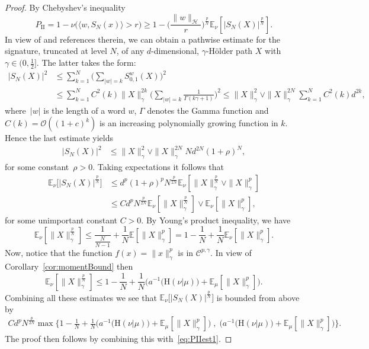 \documentclass[twoside,11pt]{article}
\numberwithin{equation}{section}
\numberwithin{theorem}{section}
\newcommand{\ex}{\mathbb{E}}
\newcommand{\h}{\mathcal{H}}
\newcommand{\Oo}{\mathcal{O}}
\newcommand{\Cc}{\mathscr{C}}
\newcommand{\Hent}{\boldsymbol{\mathrm{H}}}
\begin{document}
\begin{proof}
By Chebyshev's inequality
\begin{equation}\label{eq:PIIest1}
P_{\mathrm{II}}=1-\nu\bigg( \langle w, S_N(x)\rangle>  r     \bigg)\geq 1-\bigg(\frac{\|w\|_{\h}}{r}\bigg)^{\frac{p}{N}}\ex_\nu\left[|S_N(X)|^{\frac{p}{N}}\right].
   \end{equation} 
In view of
\cite[Section 1]{boedihardjo2018decay} and references therein, we can obtain a pathwise estimate %
for the signature, truncated at level $N$, of any $d$-dimensional, $\gamma$-H\"older path $X$ with $\gamma\in(0, \frac{1}{2}]$. The latter takes the form:
\begin{align*}
\big|S_N(X)\big|^2
 &\leq \sum_{k=1}^{N}\bigg(\sum_{|w|=k} S^w_{0,1}(X)\bigg)^2
 \\& \leq \sum_{k=1}^{N} C^2(k)\|X\|^{2k}_\gamma\bigg(\sum_{|w|=k}\frac{1}{\Gamma(k\gamma+1)}\bigg)^2\leq \|X\|^{2}_\gamma\vee\|X\|^{2N}_\gamma\sum_{k=1}^{N} C^2(k)d^{2k},
\end{align*}
where~$|w|$ is the length of a word $w$, $\Gamma$ denotes the Gamma function and $C(k)=\Oo((1+c)^k)$ is an increasing polynomially growing function in $k$.
Hence the last estimate yields 
\begin{equation}\label{eq:SigPathwiseBound}
    \begin{aligned}
\big|S_N(X)\big|^2
&\leq \|X\|^{2}_\gamma \vee\|X\|^{2N}_\gamma Nd^{2N}(1+\rho)^N,
    \end{aligned}
\end{equation}
for some constant~$\rho>0.$
Taking expectations it follows that
\begin{align*}
\ex_\nu\bigg[ \big|S_N(X)\big|^{\frac{p}{N}}\bigg]
 & \leq d^{p}(1+\rho)^{p}N^{\frac{p}{2N}}\ex_\nu\left[\|X\|^{\frac{p}{N}}_\gamma\vee\|X\|^p_\gamma \right]\\
 & \leq C d^{p}N^{\frac{p}{2N}}\ex_\nu\left[\|X\|^{\frac{p}{N}}_\gamma\right]\vee
\ex_\nu\left[\|X\|^p_\gamma \right],
\end{align*} 
for some unimportant constant $C>0$.
By Young's product inequality, we have
$$
\ex_\nu\left[\|X\|^{\frac{p}{N}}_\gamma\right]
\leq \frac{1}{\frac{N}{N-1}}+\frac{1}{N}\ex[\|X\|^{p}_\gamma]=1-\frac{1}{N}+ \frac{1}{N}\ex_\nu[\|X\|^{p}_\gamma].$$
Now, notice that the function $f(x)=\|x\|_\gamma^{p}$ is in $\Cc^{p,\gamma}$. In view of Corollary~\ref{cor:momentBound} then
$$
\ex_\nu\left[\|X\|^{\frac{p}{N}}_\gamma\right]
\leq 1-\frac{1}{N}+ \frac{1}{N}\bigg(a^{-1}\big(\Hent(\nu|\mu)\big)  +\ex_\mu[\|X\|^{p}_\gamma]\bigg).$$
Combining all these estimates we see that $\ex_\nu\bigg[ \big|S_N(X)\big|^{\frac{p}{N}}\bigg]$ is bounded from above by
\begin{equation*}
\begin{aligned}
    Cd^pN^{\frac{p}{2N}}\max\bigg\{ 1-\frac{1}{N}+ \frac{1}{N}\bigg(a^{-1}\big(\Hent(\nu|\mu)\big)  +\ex_\mu[\|X\|^{p}_\gamma]\bigg)\;,\; \bigg(a^{-1}\big(\Hent(\nu|\mu)\big)  +\ex_\mu[\|X\|^{p}_\gamma]\bigg)    \bigg\}.
\end{aligned}    
\end{equation*}
The proof then follows by combining this with~\eqref{eq:PIIest1}.
\end{proof}
\end{document}
